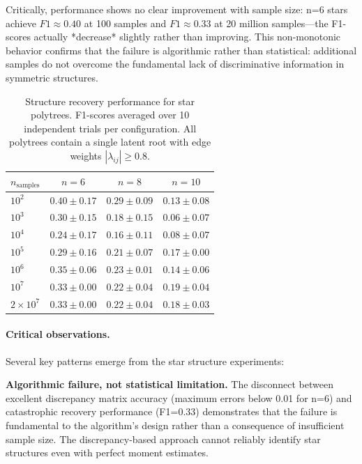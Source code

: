 \documentclass[11pt,a4paper]{article}
\numberwithin{equation}{section}
\begin{document}
Critically, performance shows no clear improvement with sample size: n=6 stars achieve $F1 \approx 0.40$ at 100 samples and $F1 \approx 0.33$ at 20 million samples—the F1-scores actually *decrease* slightly rather than improving. This non-monotonic behavior confirms that the failure is algorithmic rather than statistical: additional samples do not overcome the fundamental lack of discriminative information in symmetric structures.

\begin{table}[h]
\centering
\caption{Structure recovery performance for star polytrees. F1-scores averaged over 10 independent trials per configuration. All polytrees contain a single latent root with edge weights $|\lambda_{ij}| \geq 0.8$.}
\label{tab:star_performance}
\begin{tabular}{lccc}
\toprule
$n_{\text{samples}}$ & $n=6$ & $n=8$ & $n=10$ \\
\midrule
$10^2$ & $0.40 \pm 0.17$ & $0.29 \pm 0.09$ & $0.13 \pm 0.08$ \\
$10^3$ & $0.30 \pm 0.15$ & $0.18 \pm 0.15$ & $0.06 \pm 0.07$ \\
$10^4$ & $0.24 \pm 0.17$ & $0.16 \pm 0.11$ & $0.08 \pm 0.07$ \\
$10^5$ & $0.29 \pm 0.16$ & $0.21 \pm 0.07$ & $0.17 \pm 0.00$ \\
$10^6$ & $0.35 \pm 0.06$ & $0.23 \pm 0.01$ & $0.14 \pm 0.06$ \\
$10^7$ & $0.33 \pm 0.00$ & $0.22 \pm 0.04$ & $0.19 \pm 0.04$ \\
$2 \times 10^7$ & $0.33 \pm 0.00$ & $0.22 \pm 0.04$ & $0.18 \pm 0.03$ \\
\bottomrule
\end{tabular}
\end{table}

\paragraph{Critical observations.} Several key patterns emerge from the star structure experiments:

\textbf{Algorithmic failure, not statistical limitation.} The disconnect between excellent discrepancy matrix accuracy (maximum errors below 0.01 for n=6) and catastrophic recovery performance (F1=0.33) demonstrates that the failure is fundamental to the algorithm's design rather than a consequence of insufficient sample size. The discrepancy-based approach cannot reliably identify star structures even with perfect moment estimates.
\end{document}
